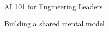 \begin{frame}[fragile]\frametitle{}
\begin{center}
{\Large AI 101 for Engineering Leaders}

{\small Building a shared mental model}
\end{center}
\end{frame}


%
%

